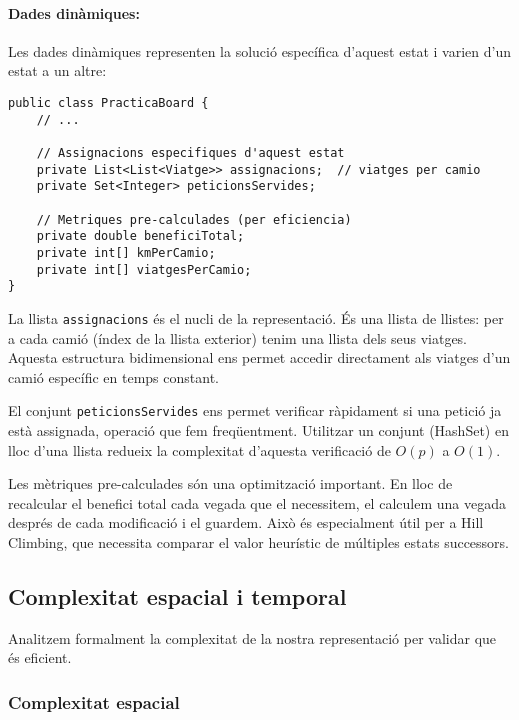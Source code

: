 \paragraph{Dades dinàmiques:}

Les dades dinàmiques representen la solució específica d'aquest estat i varien d'un estat a un altre:

\begin{lstlisting}[caption={Dades dinàmiques de l'estat}, label={lst:dynamic-data}]
public class PracticaBoard {
    // ...
    
    // Assignacions especifiques d'aquest estat
    private List<List<Viatge>> assignacions;  // viatges per camio
    private Set<Integer> peticionsServides;
    
    // Metriques pre-calculades (per eficiencia)
    private double beneficiTotal;
    private int[] kmPerCamio;
    private int[] viatgesPerCamio;
}
\end{lstlisting}

La llista \texttt{assignacions} és el nucli de la representació. És una llista de llistes: per a cada camió (índex de la llista exterior) tenim una llista dels seus viatges. Aquesta estructura bidimensional ens permet accedir directament als viatges d'un camió específic en temps constant.

El conjunt \texttt{peticionsServides} ens permet verificar ràpidament si una petició ja està assignada, operació que fem freqüentment. Utilitzar un conjunt (HashSet) en lloc d'una llista redueix la complexitat d'aquesta verificació de $O(p)$ a $O(1)$.

Les mètriques pre-calculades són una optimització important. En lloc de recalcular el benefici total cada vegada que el necessitem, el calculem una vegada després de cada modificació i el guardem. Això és especialment útil per a Hill Climbing, que necessita comparar el valor heurístic de múltiples estats successors.


\subsection{Complexitat espacial i temporal}

Analitzem formalment la complexitat de la nostra representació per validar que és eficient.

\subsubsection{Complexitat espacial}

